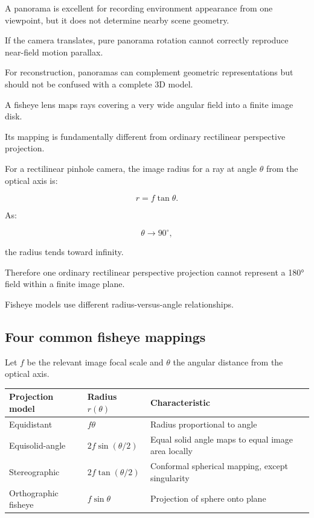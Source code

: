 A panorama is excellent for recording environment appearance from one viewpoint, but it does not determine nearby scene geometry.

If the camera translates, pure panorama rotation cannot correctly reproduce near-field motion parallax.

For reconstruction, panoramas can complement geometric representations but should not be confused with a complete 3D model.

A fisheye lens maps rays covering a very wide angular field into a finite image disk.

Its mapping is fundamentally different from ordinary rectilinear perspective projection.

For a rectilinear pinhole camera, the image radius for a ray at angle \(\theta\) from the optical axis is:

\[ \boxed{ r=f\tan\theta. } \]

As:

\[ \theta\to90^\circ, \]

the radius tends toward infinity.

Therefore one ordinary rectilinear perspective projection cannot represent a 180° field within a finite image plane.

Fisheye models use different radius-versus-angle relationships.

\subsection{Four common fisheye mappings}\label{02-foundations-ii-ch035-four-common-fisheye-mappings}

Let \(f\) be the relevant image focal scale and \(\theta\) the angular distance from the optical axis.

{\def\LTcaptype{none} %
\begin{longtable}[]{@{}
  >{\raggedright\arraybackslash}p{}
  >{\raggedright\arraybackslash}p{}
  >{\raggedright\arraybackslash}p{}@{}}
\toprule\noalign{}
\begin{minipage}[b]{\linewidth}\raggedright
Projection model
\end{minipage} & \begin{minipage}[b]{\linewidth}\raggedright
Radius \(r(\theta)\)
\end{minipage} & \begin{minipage}[b]{\linewidth}\raggedright
Characteristic
\end{minipage} \\
\midrule\noalign{}
\endhead
\bottomrule\noalign{}
\endlastfoot
Equidistant & \(f\theta\) & Radius proportional to angle \\
Equisolid-angle & \(2f\sin(\theta/2)\) & Equal solid angle maps to equal image area locally \\
Stereographic & \(2f\tan(\theta/2)\) & Conformal spherical mapping, except singularity \\
Orthographic fisheye & \(f\sin\theta\) & Projection of sphere onto plane \\
\end{longtable}
}

